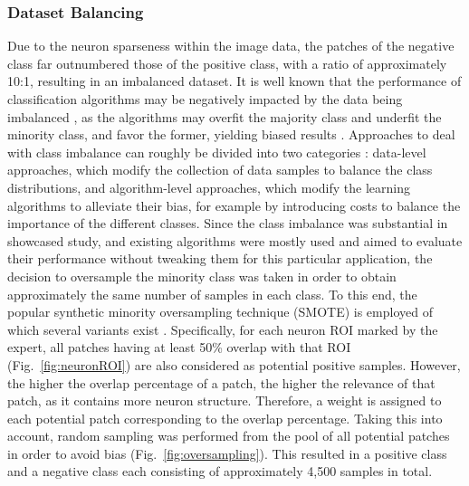 \subsubsection{Dataset Balancing}
\label{sec:balanced}
Due to the neuron sparseness within the image data, the patches of the negative class far outnumbered those of the positive class, with a ratio of approximately 10:1, resulting in an imbalanced dataset. It is well known that the performance of classification algorithms may be negatively impacted by the data being imbalanced \cite{chawla2004editorial, daskalaki2006evaluation, forman2010apples, branco2016survey}, as the algorithms may overfit the majority class and underfit the minority class, and favor the former, yielding biased results \cite{garcia2014bias, li2018adaptive}. Approaches to deal with class imbalance can roughly be divided into two categories \cite{he2008learning, krawczyk2016learning, haixiang2017learning}: data-level approaches, which modify the collection of data samples to balance the class distributions, and algorithm-level approaches, which modify the learning algorithms to alleviate their bias, for example by introducing costs to balance the importance of the different classes. Since the class imbalance was substantial in showcased study, and existing algorithms were mostly used and aimed to evaluate their performance without tweaking them for this particular application, the decision to oversample the minority class was taken in order to obtain approximately the same number of samples in each class. To this end, the popular synthetic minority oversampling technique (SMOTE) is employed \cite{chawla2002smote} of which several variants exist \cite{saez2015smote, krawczyk2016learning, gosain2017handling}. Specifically, for each neuron ROI marked by the expert, all patches having at least 50\% overlap with that ROI (Fig.~\ref{fig:neuronROI}) are also considered as potential positive samples. However, the higher the overlap percentage of a patch, the higher the relevance of that patch, as it contains more neuron structure. Therefore, a weight is assigned to each potential patch corresponding to the overlap percentage. Taking this into account, random sampling was performed from the pool of all potential patches in order to avoid bias (Fig.~\ref{fig:oversampling}). This resulted in a positive class and a negative class each consisting of approximately 4,500 samples in total.
